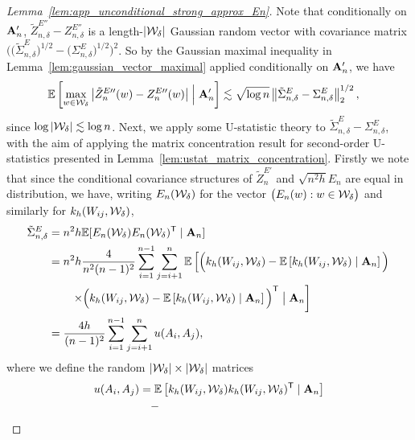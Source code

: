\begin{proof}[Lemma~\ref{lem:app_unconditional_strong_approx_En}]
  Note that conditionally on $\mathbf{A}_n'$,
  $\tilde Z_{n,\delta}^{E\dprime} - Z_{n,\delta}^{E\dprime}$
  is a length-$|\mathcal{W}_\delta|$
  Gaussian random vector with covariance matrix
  $\big(
    \big(\tilde \Sigma^E_{n,\delta}\big)^{1/2}
    - \big(\Sigma^E_{n,\delta}\big)^{1/2}
  \big)^2$.
  So by the Gaussian maximal inequality in
  Lemma~\ref{lem:gaussian_vector_maximal}
  applied conditionally on $\mathbf{A}_n'$,
  we have
  \begin{align*}
    \mathbb{E}\left[
      \max_{w \in \mathcal{W}_\delta}
      \big|\tilde Z_n^{E\prime\prime}(w) - Z_n^{E\prime\prime}(w)\big|
      \Bigm| \mathbf{A}_n'
    \right]
    &\lesssim
    \sqrt{\log n}
    \left\|
    \tilde\Sigma^E_{n,\delta}
    - \Sigma^E_{n,\delta}
    \right\|_2^{1/2},
  \end{align*}
  since $\log |\mathcal{W}_\delta| \lesssim \log n$.
  Next, we apply some U-statistic theory to
  $\tilde\Sigma^E_{n,\delta} - \Sigma^E_{n,\delta}$,
  with the aim of applying the
  matrix concentration result
  for second-order U-statistics
  presented in Lemma~\ref{lem:ustat_matrix_concentration}.
  Firstly we note that
  since
  the conditional covariance structures of
  $\tilde Z_n^{E\prime}$ and $\sqrt{n^2h} E_n$
  are equal in distribution,
  we have,
  writing $E_n(\mathcal{W}_\delta)$
  for the vector $\big(E_n(w) : w \in \mathcal{W}_\delta\big)$
  and similarly for $k_h(W_{i j}, \mathcal{W}_\delta)$,
  \begin{align*}
    \tilde\Sigma^E_{n,\delta}
    &=
    n^2h \mathbb{E}[E_n(\mathcal{W}_\delta) E_n(\mathcal{W}_\delta)^{\mathsf{T}} \mid \mathbf{A}_n] \\
    &=
    n^2h
    \frac{4}{n^2(n-1)^2}
    \sum_{i=1}^{n-1}
    \sum_{j=i+1}^{n}
    \mathbb{E}\left[
      \Big(
        k_h(W_{i j}, \mathcal{W}_\delta)
        - \mathbb{E}\left[
          k_h(W_{i j}, \mathcal{W}_\delta)
          \mid \mathbf{A}_n
        \right]
      \Big)
      \right. \\
      &\qquad\left.
      \times\Big(
        k_h(W_{i j}, \mathcal{W}_\delta)
        - \mathbb{E}\left[
          k_h(W_{i j}, \mathcal{W}_\delta)
          \mid \mathbf{A}_n
        \right]
      \Big)^{\mathsf{T}}
      \bigm\vert \mathbf{A}_n
    \right] \\
    &=
    \frac{4h}{(n-1)^2}
    \sum_{i=1}^{n-1}
    \sum_{j=i+1}^{n}
    u(A_i, A_j),
  \end{align*}
  where we
  define the random
  $|\mathcal{W}_\delta| \times |\mathcal{W}_\delta|$
  matrices
  \begin{align*}
    u(A_i, A_j)
    &=
    \E\left[
      k_h(W_{i j}, \cW_\delta)
      k_h(W_{i j}, \cW_\delta)^\T
      \mid \bA_n
    \right] \\
    &\quad-

\end{align*}
\end{proof}
